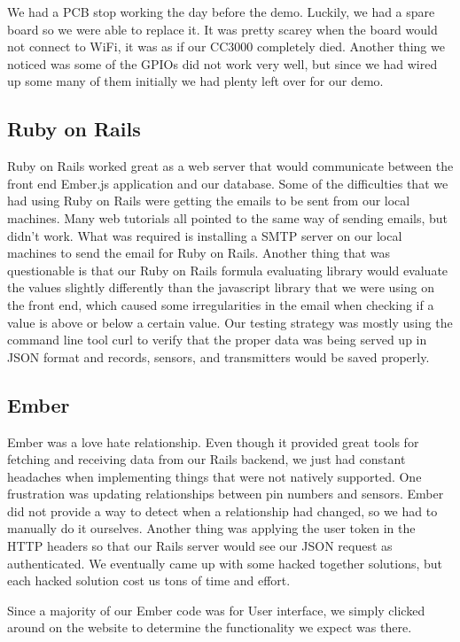 \documentclass[letterpaper, 12 pt]{article}
\begin{document}
  We had a PCB stop working the day before the demo. Luckily, we had a spare board so we were able to replace it. It was pretty scarey when the board would not connect to WiFi, it was as if our CC3000 completely died. Another thing we noticed was some of the GPIOs did not work very well, but since we had wired up some many of them initially we had plenty left over for our demo. 

\subsection{Ruby on Rails}
Ruby on Rails worked great as a web server that would communicate between the front end Ember.js application and our database. Some of the difficulties that we had using Ruby on Rails were getting the emails to be sent from our local machines. Many web tutorials all pointed to the same way of sending emails, but didn’t work. What was required is installing a SMTP server on our local machines to send the email for Ruby on Rails. Another thing that was questionable is that our Ruby on Rails formula evaluating library would evaluate the values slightly differently than the javascript library that we were using on the front end, which caused some irregularities in the email when checking if a value is above or below a certain value. Our testing strategy was mostly using the command line tool curl to verify that the proper data was being served up in JSON format and records, sensors, and transmitters would be saved properly.

\subsection{Ember}
Ember was a love hate relationship. Even though it provided great tools for fetching and receiving data from our Rails backend, we just had constant headaches when implementing things that were not natively supported. One frustration was updating relationships between pin numbers and sensors. Ember did not provide a way to detect when a relationship had changed, so we had to manually do it ourselves. Another thing was applying the user token in the HTTP headers so that our Rails server would see our JSON request as authenticated. We eventually came up with some hacked together solutions, but each hacked solution cost us tons of time and effort. 

Since a majority of our Ember code was for User interface, we simply clicked around on the website to determine the functionality we expect was there. 
\end{document}
